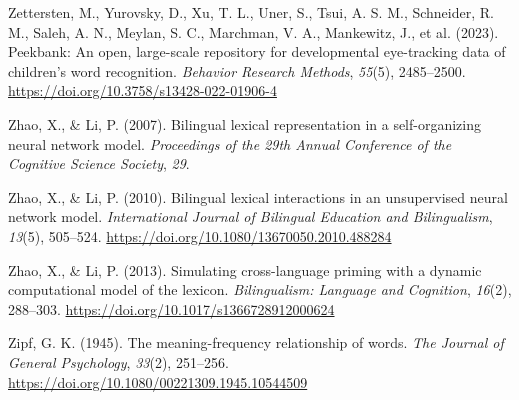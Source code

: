 \documentclass[
  12pt,
  b5paperpaper,
  twoside]{scrreprt}
\newlength{\cslhangindent}
\newlength{\cslentryspacingunit} %
\newenvironment{CSLReferences}[2] %
 {%
  \setlength{\parindent}{0pt}
  \ifodd #1
  \let\oldpar\par
  \def\par{\hangindent=\cslhangindent\oldpar}
  \fi
  \setlength{\parskip}{#2\cslentryspacingunit}
 }%
 {}
\begin{document}
\begin{CSLReferences}{1}{0}
\leavevmode{}%
Zettersten, M., Yurovsky, D., Xu, T. L., Uner, S., Tsui, A. S. M.,
Schneider, R. M., Saleh, A. N., Meylan, S. C., Marchman, V. A.,
Mankewitz, J., et al. (2023). Peekbank: An open, large-scale repository
for developmental eye-tracking data of children's word recognition.
\emph{Behavior Research Methods}, \emph{55}(5), 2485--2500.
\url{https://doi.org/10.3758/s13428-022-01906-4}

\leavevmode{}%
Zhao, X., \& Li, P. (2007). Bilingual lexical representation in a
self-organizing neural network model. \emph{Proceedings of the 29th
{Annual Conference} of the {Cognitive Science Society}}, \emph{29}.

\leavevmode{}%
Zhao, X., \& Li, P. (2010). Bilingual lexical interactions in an
unsupervised neural network model. \emph{International Journal of
Bilingual Education and Bilingualism}, \emph{13}(5), 505--524.
\url{https://doi.org/10.1080/13670050.2010.488284}

\leavevmode{}%
Zhao, X., \& Li, P. (2013). Simulating cross-language priming with a
dynamic computational model of the lexicon. \emph{Bilingualism: Language
and Cognition}, \emph{16}(2), 288--303.
\url{https://doi.org/10.1017/s1366728912000624}

\leavevmode{}%
Zipf, G. K. (1945). The meaning-frequency relationship of words.
\emph{The Journal of General Psychology}, \emph{33}(2), 251--256.
\url{https://doi.org/10.1080/00221309.1945.10544509}

\end{CSLReferences}

\endgroup
\end{document}

